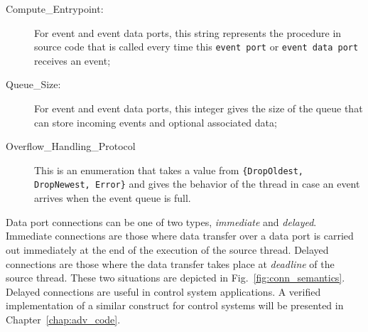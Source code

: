 \begin{description}
\item[Compute\_Entrypoint:]{For event and event data ports, this
  string represents the procedure in source code that is called every
  time this \texttt{event port} or \texttt{event data port} receives
  an event;}
\item[Queue\_Size:]{For event and event data ports, this integer gives
  the size of the queue that can store incoming events and optional
  associated data;}
\item[Overflow\_Handling\_Protocol]{This is an enumeration that takes
  a value from \texttt{\{DropOldest, DropNewest, Error\}} and gives the
  behavior of the thread in case an event arrives when the event
  queue is full.}
\end{description}

Data port connections can be one of two types, \emph{immediate} and
\emph{delayed}. Immediate connections are those where data transfer
over a data port is carried out immediately at the end of the
execution of the source thread. Delayed connections are those where
the data transfer takes place at \emph{deadline} of the source
thread. These two situations are depicted in
Fig.~\ref{fig:conn_semantics}. Delayed connections are useful in
control system applications. A verified implementation of a similar
construct for control systems will be presented in
Chapter~\ref{chap:adv_code}.


